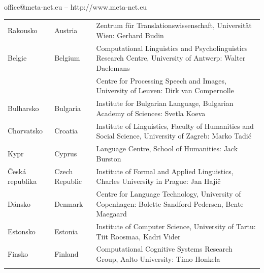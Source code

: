 \vfill
\centerline{office@meta-net.eu -- http://www.meta-net.eu}

\cleardoublepage

\appendix
{}




\cleardoublepage



\label{metanetmembers}

\small
\begin{longtable}{@{}llp{113mm}@{}}
  Rakousko & \textcolor{grey1}{Austria} & Zentrum für Translationswissenschaft, Universität Wien: Gerhard Budin\\ \addlinespace 
  Belgie & \textcolor{grey1}{Belgium} & Computational Linguistics and Psycholinguistics Research Centre, University of Antwerp: Walter Daelemans\\ \addlinespace
  & & Centre for Processing Speech and Images, University of Leuven: Dirk van Compernolle \\ \addlinespace
  Bulharsko & \textcolor{grey1}{Bulgaria} & Institute for Bulgarian Language, Bulgarian Academy of Sciences: Svetla Koeva \\ \addlinespace
  Chorvatsko & \textcolor{grey1}{Croatia} & Institute of Linguistics, Faculty of Humanities and Social Science, University of Zagreb: Marko Tadić \\ \addlinespace
  Kypr & \textcolor{grey1}{Cyprus} & Language Centre, School of Humanities: Jack Burston \\ \addlinespace
  Česká republika & \textcolor{grey1}{Czech Republic} & Institute of Formal and Applied Linguistics, Charles University in Prague: Jan Hajič \\ \addlinespace 
  Dánsko &  \textcolor{grey1}{Denmark} & Centre for Language Technology, University of Copenhagen: \newline Bolette Sandford Pedersen, Bente Maegaard\\ \addlinespace
  Estonsko & \textcolor{grey1}{Estonia} & Institute of Computer Science, University of Tartu: Tiit Roosmaa, Kadri Vider\\ \addlinespace
  Finsko & \textcolor{grey1}{Finland} & Computational Cognitive Systems Research Group, Aalto University: Timo Honkela\\ \addlinespace

\end{longtable}
